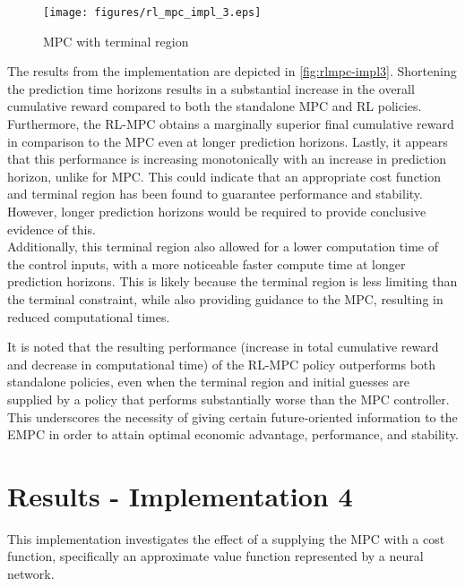 \begin{figure}[H]
	\centering
	\texttt{[image: figures/rl\_mpc\_impl\_3.eps]}
	\caption{MPC with terminal region}
	\label{fig:rlmpc-impl3}
\end{figure}

The results from the implementation are depicted in \autoref{fig:rlmpc-impl3}. Shortening the prediction time horizons results in a substantial increase in the overall cumulative reward compared to both the standalone MPC and RL policies. Furthermore, the RL-MPC obtains a marginally superior final cumulative reward in comparison to the MPC even at longer prediction horizons. Lastly, it appears that this performance is increasing monotonically with an increase in prediction horizon, unlike for MPC. This could indicate that an appropriate cost function and terminal region has been found to  guarantee performance and stability. However, longer prediction horizons would be required to provide conclusive evidence of this.\\

Additionally, this terminal region also allowed for a lower computation time of the control inputs, with a more noticeable faster compute time at longer prediction horizons. This is likely because the terminal region is less limiting than the terminal constraint,  while also providing guidance to the MPC, resulting in reduced computational times.

It is noted that the resulting performance (increase in total cumulative reward and decrease in computational time) of the RL-MPC policy outperforms both standalone policies, even when the terminal region and initial guesses are supplied by a policy that performs substantially worse than the MPC controller. This underscores the necessity of giving certain future-oriented information to the EMPC in order to attain optimal economic advantage, performance, and stability. 

\section{Results - Implementation 4}
This implementation investigates the effect of a supplying the MPC with a cost function, specifically an approximate value function represented by a neural network.


